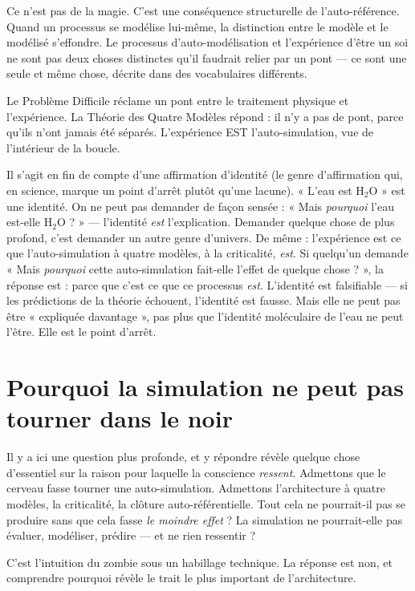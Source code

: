 \documentclass[11pt, twoside, openright]{book}
\begin{document}
Ce n'est pas de la magie. C'est une conséquence structurelle de l'auto-référence. Quand un processus se modélise lui-même, la distinction entre le modèle et le modélisé s'effondre. Le processus d'auto-modélisation et l'expérience d'être un soi ne sont pas deux choses distinctes qu'il faudrait relier par un pont --- ce sont une seule et même chose, décrite dans des vocabulaires différents.

Le Problème Difficile réclame un pont entre le traitement physique et l'expérience. La Théorie des Quatre Modèles répond : il n'y a pas de pont, parce qu'ils n'ont jamais été séparés. L'expérience EST l'auto-simulation, vue de l'intérieur de la boucle.

Il s'agit en fin de compte d'une affirmation d'identité (le genre d'affirmation qui, en science, marque un point d'arrêt plutôt qu'une lacune). « L'eau est H$_2$O » est une identité. On ne peut pas demander de façon sensée : « Mais \textit{pourquoi} l'eau est-elle H$_2$O ? » --- l'identité \textit{est} l'explication. Demander quelque chose de plus profond, c'est demander un autre genre d'univers. De même : l'expérience est ce que l'auto-simulation à quatre modèles, à la criticalité, \textit{est}. Si quelqu'un demande « Mais \textit{pourquoi} cette auto-simulation fait-elle l'effet de quelque chose ? », la réponse est : parce que c'est ce que ce processus \textit{est}. L'identité est falsifiable --- si les prédictions de la théorie échouent, l'identité est fausse. Mais elle ne peut pas être « expliquée davantage », pas plus que l'identité moléculaire de l'eau ne peut l'être. Elle est le point d'arrêt.

\section*{Pourquoi la simulation ne peut pas tourner dans le noir}

Il y a ici une question plus profonde, et y répondre révèle quelque chose d'essentiel sur la raison pour laquelle la conscience \textit{ressent}. Admettons que le cerveau fasse tourner une auto-simulation. Admettons l'architecture à quatre modèles, la criticalité, la clôture auto-référentielle. Tout cela ne pourrait-il pas se produire sans que cela fasse \textit{le moindre effet} ? La simulation ne pourrait-elle pas évaluer, modéliser, prédire --- et ne rien ressentir ?

C'est l'intuition du zombie sous un habillage technique. La réponse est non, et comprendre pourquoi révèle le trait le plus important de l'architecture.
\end{document}
